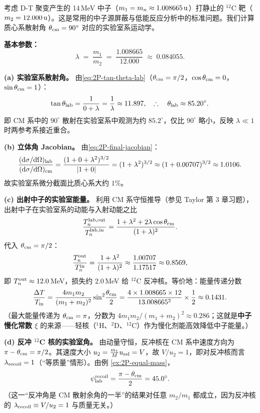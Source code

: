 \begin{example}\label{ex:2P-n-C12}
考虑 D-T 聚变产生的 14\,MeV 中子（$m_1=m_n\approx 1.008665\,\rm{u}$）打静止的 $^{12}$C 靶（$m_2=12.000\,\rm{u}$）。这是常用的中子源屏蔽与低能反应分析中的标准问题。我们计算质心系散射角 $\theta_{\rm cm}=90^\circ$ 对应的实验室系运动学。

\textbf{基本参数：}
\[
  \lambda \;=\; \frac{m_1}{m_2} \;=\; \frac{1.008665}{12.000} \;\approx\; 0.084055.
\]

\textbf{(a) 实验室系散射角。} 由\eqref{eq:2P-tan-theta-lab}（$\theta_{\rm cm}=\pi/2$，$\cos\theta_{\rm cm}=0$，$\sin\theta_{\rm cm}=1$）：
\[
  \tan\theta_{\rm lab} = \frac{1}{0+\lambda} = \frac{1}{\lambda} \approx 11.897,
  \quad\therefore\quad \theta_{\rm lab} \approx 85.20^{\circ}.
\]
即 CM 系中的 $90^\circ$ 散射在实验室系中观测为约 $85.2^\circ$，仅比 $90^\circ$ 略小，反映 $\lambda\ll 1$ 时两参考系接近重合。

\textbf{(b) 立体角 Jacobian。} 由\eqref{eq:2P-final-jacobian}：
\[
  \frac{(\mathrm{d}\sigma/\mathrm{d}\Omega)_{\rm lab}}{(\mathrm{d}\sigma/\mathrm{d}\Omega)_{\rm cm}}
  = \frac{(1+0+\lambda^2)^{3/2}}{|1+0|} = (1+\lambda^2)^{3/2}
  \approx (1+0.00707)^{3/2} \approx 1.0106.
\]
故实验室系微分截面比质心系大约 $1\%$。

\textbf{(c) 出射中子的实验室能量。} 利用 CM 系守恒推导（参见 Taylor 第 3 章习题），出射中子在实验室系的动能与入射动能之比
\[
  \frac{T_n^{\rm lab,out}}{T_n^{\rm lab,in}}
  = \frac{1+\lambda^2+2\lambda\cos\theta_{\rm cm}}{(1+\lambda)^2}.
\]
代入 $\theta_{\rm cm}=\pi/2$：
\[
  \frac{T_n^{\rm out}}{T_n^{\rm in}} = \frac{1+\lambda^2}{(1+\lambda)^2}
  \approx \frac{1.00707}{1.17517} \approx 0.8569,
\]
即 $T_n^{\rm out}\approx 12.0$\,MeV，损失约 $2.0$\,MeV 给 $^{12}$C 反冲核。等价地：能量传递分数
\[
  \frac{\Delta T}{T_{\rm in}} = \frac{4 m_1 m_2}{(m_1+m_2)^2}\sin^2\!\frac{\theta_{\rm cm}}{2}
  = \frac{4\times 1.008665\times 12}{13.008665^2}\times\frac{1}{2}
  \approx 0.1431.
\]
（最大能量传递为 $\theta_{\rm cm}=\pi$，分数为 $4 m_1 m_2/(m_1+m_2)^2\approx 0.286$；这就是\textbf{中子慢化常数 $\xi$} 的来源——轻核（$^{1}$H、$^{2}$D、$^{12}$C）作为慢化剂能高效降低中子能量。）

\textbf{(d) 反冲 $^{12}$C 核的实验室角。} 由动量守恒，反冲核在 CM 系中速度方向为 $\pi-\theta_{\rm cm}=\pi/2$。其速度大小 $u_2=\frac{m_1}{M}u_{\rm rel}=V$，故 $V/u_2=1$，即对反冲核而言 $\lambda_{\rm recoil}=1$（“等质量”情形）。由例 \ref{ex:2P-equal-mass}，
\[
  \psi_{\rm lab}^{\rm recoil} = \frac{\pi-\theta_{\rm cm}}{2} = 45.0^\circ.
\]
（这一“反冲角是 CM 散射余角的一半”的结果对任意 $m_2/m_1$ 都成立，因为反冲核的 $\lambda_{\rm recoil}\equiv V/u_2=1$ 与质量无关。）


\end{example}
